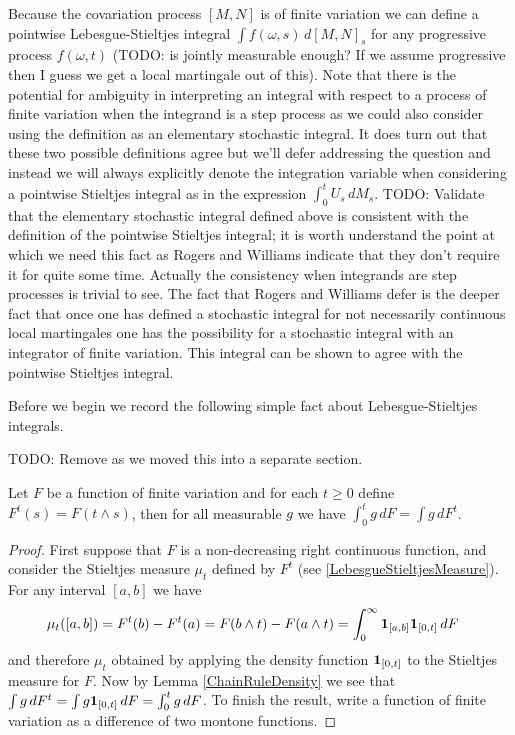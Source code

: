 Because the covariation process $[M,N]$ is of finite variation we can define a pointwise Lebesgue-Stieltjes integral $\int f(\omega,s) \, d[M,N]_s$ for any progressive process $f(\omega,t)$ (TODO: is jointly measurable enough?  If we assume progressive then I guess we get a local martingale out of this).  Note that there is the potential for ambiguity in interpreting an integral with respect to a process of finite variation when the integrand is a step process as we could also consider using the definition as an elementary stochastic integral.  It does turn out that these two possible definitions agree but we'll defer addressing the question and instead we will always explicitly denote the integration variable when considering a pointwise Stieltjes integral as in the expression $\int_0^t U_s \, dM_s$.  TODO: Validate that the elementary stochastic integral defined above is consistent with the definition of the pointwise Stieltjes integral; it is worth understand the point at which we need this fact as Rogers and Williams indicate that they don't require it for quite some time.  Actually the consistency when integrands are step processes is trivial to see.  The fact that Rogers and Williams defer is the deeper fact that once one has defined a stochastic integral for not necessarily continuous local martingales one has the possibility for a stochastic integral with an integrator of finite variation.  This integral can be shown to agree with the pointwise Stieltjes integral.

Before we begin we record the following simple fact about Lebesgue-Stieltjes integrals.

TODO: Remove as we moved this into a separate section.
\begin{lem}\label{StoppingStieltjesIntegrals}Let $F$ be a function of finite variation and for each $t \geq 0$ define $F^t(s) = F(t \wedge s)$, then for all measurable $g$ we have $\int_0^t g \, dF = \int g \, dF^t$.
\end{lem}
\begin{proof}
First suppose that $F$ is a non-decreasing right continuous function, and consider the Stieltjes measure $\mu_t$ defined by $F^t$ (see \ref{LebesgueStieltjesMeasure}).  For any interval $[a,b]$ we have
\begin{align*}
\mu_t([a,b]) &= F^t(b) - F^t(a) = F(b \wedge t) - F(a \wedge t) = \int_0^\infty \textbf{1}_{[a,b]} \textbf{1}_{[0,t]} \, dF 
\end{align*}
and therefore $\mu_t$ obtained by applying the density function $\textbf{1}_{[0,t]}$ to the Stieltjes measure for $F$.  Now by Lemma \ref{ChainRuleDensity} we see that $\int g \, dF^t = \int g \textbf{1}_{[0,t]} \, dF = \int_0^t g \, dF$.  To finish the result, write a function of finite variation as a difference of two montone functions.
\end{proof}

